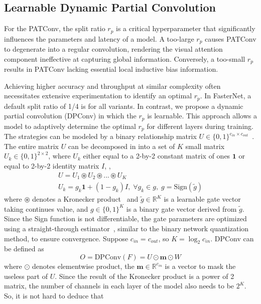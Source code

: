 \subsection{Learnable Dynamic Partial Convolution}
For the PATConv, the split ratio {\small $r_p$} is a critical hyperparameter that significantly influences the parameters and latency of a model. A too-large {\small $r_p$} causes PATConv to degenerate into a regular convolution, rendering the visual attention component ineffective at capturing global information. Conversely, a too-small {\small $r_p$} results in PATConv lacking essential local inductive bias information.

Achieving higher accuracy and throughput at similar complexity often necessitates extensive experimentation to identify an optimal {\small $r_p$}. In FasterNet, a default split ratio of 1/4 is for all variants. In contrast, we propose a dynamic partial convolution (DPConv) in which the {\small $r_p$} is learnable. This approach allows a model to adaptively determine the optimal {\small $r_p$} for different layers during training. The strategies can be modeled by a binary relationship matrix {\small $U \in \{0,1\}^{c_{in}\times c_{out}}$}~\cite{Zhang2019c}. The entire matrix {\small $U$} can be decomposed in into a set of {\small $K$} small matrix {\small $U_{k} \in \{0,1\}^{2\times 2}$}, where {\small $U_{k}$} either equal to a 2-by-2 constant matrix of ones {\small $\mathbf{1}$} or equal to 2-by-2 identity matrix {\small $I$}, \ie, 
{\small
\begin{gather} 
 U =U_{1}\circledast U_{2}\circledast ... \circledast U_{K}\\
 U_{k} = g_{k}\mathbf{1}+(1-g_{k})I,\; \forall g_{k} \in g,\; g = \text{Sign}(\widetilde{g})
\end{gather}
}
where $\circledast$ denotes a Kronecker product~\cite{broxson2006kronecker} and {\small $\widetilde{g} \in \mathbb{R}^{K}$} is a learnable gate vector taking continues value, and {\small $g \in \{0,1\}^K$} is a binary gate vector derived from {\small $\widetilde{g}$}. Since the {\small Sign} function is not differentiable, the gate parameters are optimized using a straight-through estimator~\cite{Courbariaux2016}, similar to the binary network quantization method, to ensure convergence. Suppose {\small $c_{in}=c_{out}$}, so {\small $K=\log_{2}c_{in}$}. DPConv can be defined as
{\small
\begin{equation} 
  O =\text{DPConv}(F) = U \odot \mathbf{m} \odot W
\end{equation}
}
where $\odot$ denotes elementwise product, the {\small $\mathbf{m}\in \mathbb{R}^{c_{in}}$} is a vector to mask the useless part of {\small $U$}. Since the result of the Kronecker product is a power of 2 matrix, the number of channels in each layer of the model also needs to be {\small$2^K$}. So, it is not hard to deduce that 
